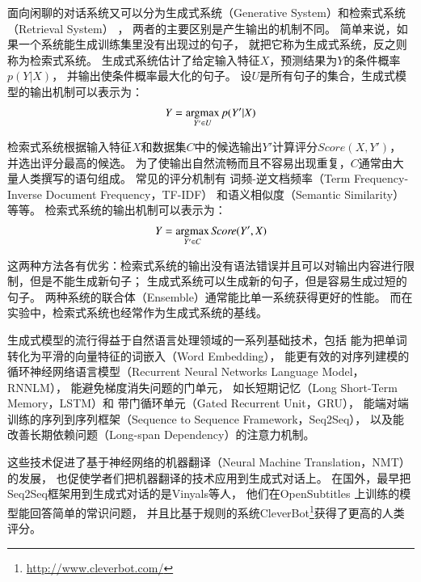 面向闲聊的对话系统又可以分为生成式系统（Generative System）和检索式系统（Retrieval System）
，
两者的主要区别是产生输出的机制不同。
简单来说，如果一个系统能生成训练集里没有出现过的句子，
就把它称为生成式系统，反之则称为检索式系统。
生成式系统估计了给定输入特征$X$，预测结果为$Y$的条件概率$p(Y|X)$，
并输出使条件概率最大化的句子。
设$U$是所有句子的集合，生成式模型的输出机制可以表示为：
\begin{align}
    Y = \operatorname*{argmax}_{Y'\in U} p(Y'|X)
\end{align}

检索式系统根据输入特征$X$和数据集$C$中的候选输出$Y'$计算评分$\textit{Score}(X, Y')$，
并选出评分最高的候选。
为了使输出自然流畅而且不容易出现重复，$C$通常由大量人类撰写的语句组成。
常见的评分机制有
词频-逆文档频率（Term Frequency-Inverse Document Frequency，TF-IDF）
和语义相似度（Semantic Similarity）等等。
检索式系统的输出机制可以表示为：
\begin{align}
    Y = \operatorname*{argmax}_{Y'\in C} \textit{Score}(Y', X)
\end{align}

这两种方法各有优劣：检索式系统的输出没有语法错误并且可以对输出内容进行限制，但是不能生成新句子；
生成式系统可以生成新的句子，但是容易生成过短的句子。
两种系统的联合体（Ensemble）通常能比单一系统获得更好的性能。
而在实验中，检索式系统也经常作为生成式系统的基线。

生成式模型的流行得益于自然语言处理领域的一系列基础技术，包括
能为把单词转化为平滑的向量特征的词嵌入（Word Embedding），
能更有效的对序列建模的循环神经网络语言模型（Recurrent Neural Networks Language Model，RNNLM），
能避免梯度消失问题的门单元，
如长短期记忆（Long Short-Term Memory，LSTM）和
带门循环单元（Gated Recurrent Unit，GRU），
能端对端训练的序列到序列框架（Sequence to Sequence Framework，Seq2Seq），
以及能改善长期依赖问题（Long-span Dependency）的注意力机制。

这些技术促进了基于神经网络的机器翻译（Neural Machine Translation，NMT）的发展，
也促使学者们把机器翻译的技术应用到生成式对话上。
在国外，最早把Seq2Seq框架用到生成式对话的是Vinyals等人，
他们在OpenSubtitles
上训练的模型能回答简单的常识问题，
并且比基于规则的系统CleverBot\footnote{\url{http://www.cleverbot.com/}}获得了更高的人类评分。

